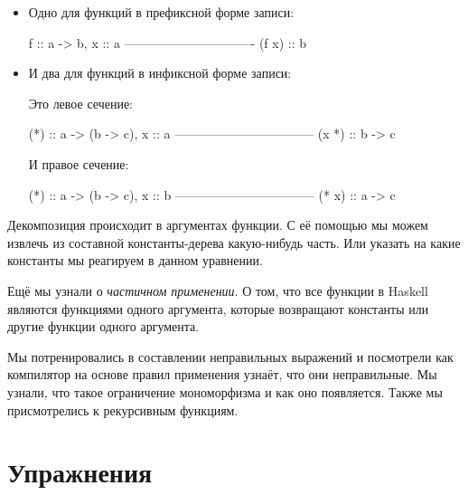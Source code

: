 \begin{itemize}

\item Одно для функций в префиксной форме записи:

\begin{code}
                    f :: a -> b,           x :: a 
                    -------------------------------
                              (f x) :: b
\end{code}

\item И два для функций в инфиксной форме записи:

Это левое сечение:

\begin{code}
                    (*) :: a -> (b -> c),     x :: a 
                    ---------------------------------
                             (x *) :: b -> c
\end{code}

И правое сечение:

\begin{code}
                    (*) :: a -> (b -> c),     x :: b 
                    ---------------------------------
                                (* x) :: a -> c
\end{code}

\end{itemize}


Декомпозиция происходит в аргументах функции. 
С её помощью мы можем извлечь из составной константы-дерева
какую-нибудь часть. Или указать на какие константы мы реагируем 
в данном уравнении. 

Ещё мы узнали о \emph{частичном применении}. О том, что все
функции в Haskell являются функциями одного аргумента,
которые возвращают константы или другие функции одного аргумента. 

Мы потренировались в составлении неправильных выражений
и посмотрели как компилятор на основе правил применения 
узнаёт, что они неправильные. Мы узнали, что такое
ограничение мономорфизма и как оно появляется.
Также мы присмотрелись к рекурсивным функциям. 


\section{Упражнения}

